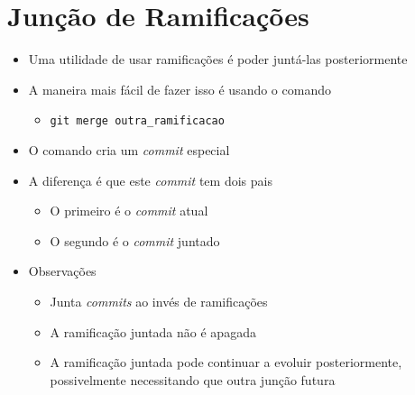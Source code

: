 \documentclass{beamer}
\newenvironment{slide}{\begin{frame}{\insertsection}}{\end{frame}}
\begin{document}
\section{Junção de Ramificações}
\begin{slide}
    \begin{itemize}
        \item Uma utilidade de usar ramificações é poder juntá-las
            posteriormente
        \pause
        \item A maneira mais fácil de fazer isso é usando o comando
        \begin{itemize}
            \pause
            \item \texttt{git merge outra\_ramificacao}
        \end{itemize}
        \pause
        \item O comando cria um \emph{commit} especial
        \pause
        \item A diferença é que este \emph{commit} tem dois pais
        \begin{itemize}
            \pause
            \item O primeiro é o \emph{commit} atual
            \pause
            \item O segundo é o \emph{commit} juntado
        \end{itemize}
        \pause
        \item Observações
        \begin{itemize}
            \pause
            \item Junta \emph{commits} ao invés de ramificações
            \pause
            \item A ramificação juntada não é apagada
            \pause
            \item A ramificação juntada pode continuar a evoluir posteriormente,
                possivelmente necessitando que outra junção futura
        \end{itemize}
    \end{itemize}
\end{slide}
\end{document}

